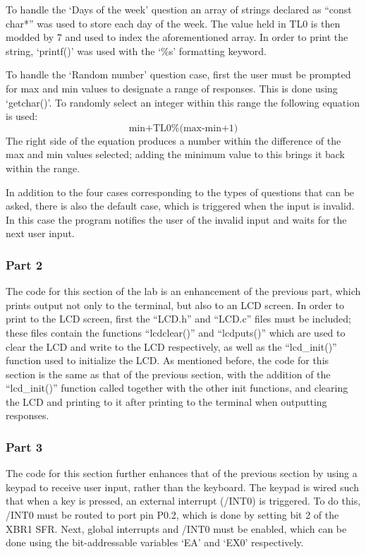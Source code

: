 \documentclass[12pt]{article}
\begin{document}
To handle the `Days of the week' question an array of strings declared as ``const char*'' was used to store each day of the week. The value held in TL0 is then modded by 7 and used to index the aforementioned array. In order to print the string, `printf()' was used with the `\%s' formatting keyword. 

To handle the `Random number' question case, first the user must be prompted for max and min values to designate a range of responses. This is done using `getchar()'. To randomly select an integer within this range the following equation is used:
\begin{displaymath}
\text{min+TL0\%(max-min+1)}
\end{displaymath}
The right side of the equation produces a number within the difference of the max and min values selected; adding the minimum value to this brings it back within the range. 

In addition to the four cases corresponding to the types of questions that can be asked, there is also the default case, which is triggered when the input is invalid. In this case the program notifies the user of the invalid input and waits for the next user input. 

\subsubsection{Part 2}
The code for this section of the lab is an enhancement of the previous part, which prints output not only to the terminal, but also to an LCD screen. In order to print to the LCD screen, first the ``LCD.h'' and ``LCD.c'' files must be included; these files contain the functions ``lcd\textunderscore clear()'' and ``lcd\textunderscore puts()'' which are used to clear the LCD and write to the LCD respectively, as well as the ``lcd\_init()'' function used to initialize the LCD. As mentioned before, the code for this section is the same as that of the previous section, with the addition of the ``lcd\_init()'' function called together with the other init functions, and clearing the LCD and printing to it after printing to the terminal when outputting responses. 

\subsubsection{Part 3}
The code for this section further enhances that of the previous section by using a keypad to receive user input, rather than the keyboard. The keypad is wired such that when a key is pressed, an external interrupt (/INT0) is triggered. To do this, /INT0 must be routed to port pin P0.2, which is done by setting bit 2 of the XBR1 SFR. Next, global interrupts and /INT0 must be enabled, which can be done using the bit-addressable variables `EA' and `EX0' respectively. 
\end{document}
